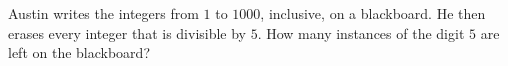 Austin writes the integers from $1$ to $1000$, inclusive, on a blackboard. He then erases every integer that is divisible by $5$. How many instances of the digit $5$ are left on the blackboard?
